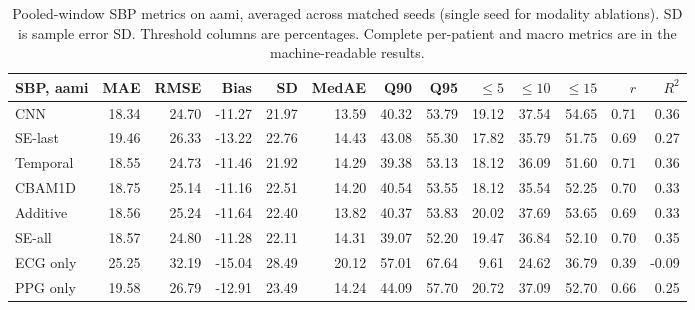 \documentclass[11pt]{article}
\begin{document}
\begin{table}[t]\centering\scriptsize\setlength{\tabcolsep}{3pt}
\begin{tabular}{lrrrrrrrrrrrr}\toprule
SBP, aami & MAE & RMSE & Bias & SD & MedAE & Q90 & Q95 & $\leq5$ & $\leq10$ & $\leq15$ & $r$ & $R^2$\\\midrule
CNN & 18.34 & 24.70 & -11.27 & 21.97 & 13.59 & 40.32 & 53.79 & 19.12 & 37.54 & 54.65 & 0.71 & 0.36\\
SE-last & 19.46 & 26.33 & -13.22 & 22.76 & 14.43 & 43.08 & 55.30 & 17.82 & 35.79 & 51.75 & 0.69 & 0.27\\
Temporal & 18.55 & 24.73 & -11.46 & 21.92 & 14.29 & 39.38 & 53.13 & 18.12 & 36.09 & 51.60 & 0.71 & 0.36\\
CBAM1D & 18.75 & 25.14 & -11.16 & 22.51 & 14.20 & 40.54 & 53.55 & 18.12 & 35.54 & 52.25 & 0.70 & 0.33\\
Additive & 18.56 & 25.24 & -11.64 & 22.40 & 13.82 & 40.37 & 53.83 & 20.02 & 37.69 & 53.65 & 0.69 & 0.33\\
SE-all & 18.57 & 24.80 & -11.28 & 22.11 & 14.31 & 39.07 & 52.20 & 19.47 & 36.84 & 52.10 & 0.70 & 0.35\\
ECG only & 25.25 & 32.19 & -15.04 & 28.49 & 20.12 & 57.01 & 67.64 & 9.61 & 24.62 & 36.79 & 0.39 & -0.09\\
PPG only & 19.58 & 26.79 & -12.91 & 23.49 & 14.24 & 44.09 & 57.70 & 20.72 & 37.09 & 52.70 & 0.66 & 0.25\\
\bottomrule\end{tabular}
\caption{Pooled-window SBP metrics on aami, averaged across matched seeds (single seed for modality ablations). SD is sample error SD. Threshold columns are percentages. Complete per-patient and macro metrics are in the machine-readable results.}\end{table}
\end{document}
